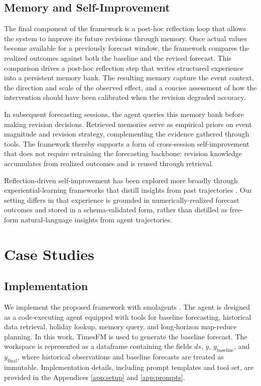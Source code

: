 \documentclass{article}
\theoremstyle{plain}
\theoremstyle{definition}
\theoremstyle{remark}
\begin{document}
\subsection{Memory and Self-Improvement}\label{sec:memory-improve}


The final component of the framework is a post-hoc reflection loop that allows the system to improve its future revisions through memory. Once actual values become available for a previously forecast window, the framework compares the realized outcomes against both the baseline and the revised forecast. This comparison drives a post-hoc reflection step that writes structured experience into a persistent memory bank. The resulting memory capture the event context, the direction and scale of the observed effect, and a concise assessment of how the intervention should have been calibrated when the revision degraded accuracy.

In subsequent forecasting sessions, the agent queries this memory bank before making revision decisions. Retrieved memories serve as empirical priors on event magnitude and revision strategy, complementing the evidence gathered through tools. The framework thereby supports a form of cross-session self-improvement that does not require retraining the forecasting backbone: revision knowledge accumulates from realized outcomes and is reused through retrieval.

Reflection-driven self-improvement has been explored more broadly through experiential-learning frameworks that distill insights from past trajectories \cite{zhao2024expel}. Our setting differs in that experience is grounded in numerically-realized forecast outcomes and stored in a schema-validated form, rather than distilled as free-form natural-language insights from agent trajectories.


\section{Case Studies}

\subsection{Implementation}
We implement the proposed framework with smolagents \cite{smolagents}. The agent is designed as a code‑executing agent equipped with tools for baseline forecasting, historical data retrieval, holiday lookup, memory query, and long‑horizon map‑reduce planning. In this work, TimesFM is used to generate the baseline forecast. The workspace is represented as a dataframe containing the fields \(ds\), \(y\), \(y_{\text{baseline}}\), and \(y_{\text{final}}\), where historical observations and baseline forecasts are treated as immutable. Implementation details, including prompt templates and tool set, are provided in the Appendices \ref{app:setup} and \ref{app:prompts}.
\end{document}
